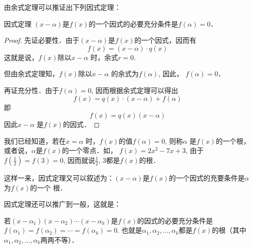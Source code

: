 由余式定理可以推证出下列因式定理：

\begin{blk}{因式定理}
$(x-\alpha)$是$f(x)$的一个因式的必要充分条件是$f (\alpha) =0$．
\end{blk}

\begin{proof}
  先证必要性．由于$(x-\alpha)$是$f(x)$的一个因式，因而有
\[f (x) = (x-\alpha ) \cdot q (x) \]
这就是说，$f(x)$除以$x-\alpha$ 时，余式$r=0$.

但由余式定理知，$f(x)$除以$x-\alpha$ 的余式为$f(\alpha )$, 因此，
$f (\alpha) =0$．

再证充分性．由于$f(\alpha )=0$, 因而根据余式定理可以得出
\[f (x) =q (x) \cdot  (x-\alpha ) +f (\alpha ) \]
即
\[f (x) =q (x) (x-\alpha )\]
因此$x-\alpha$ 是$f(x)$的因式．  
\end{proof}


我们已经知道，若在$x=\alpha$ 时，$f(x)$的值$f(\alpha )=0$, 则称$\alpha$ 是$f(x)$的一个根，或者说，$\alpha$是$f(x)$的一个零点．如，
$f(x)=2x^2-7x+3$, 由于$f\left(\frac{1}{2}\right)=f(3)=0$, 因而就说$\frac{1}{2}$,
3都是$f(x)$的根．

这样一来，因式定理又可以叙述为：$(x-\alpha)$是$f(x)$的一个因式的充要条件是$\alpha$ 为$f(x)$的一个
根．

因式定理还可以推广到一般，这就是：

若$(x-\alpha_1)(x-\alpha_2)\cdots(x-\alpha_k)$是$f(x)$的因式的必要充分条件是$f(\alpha_1)=f(\alpha_2) =\cdots=f(\alpha_k)=0$. 也就是$\alpha_1,\alpha_2,\ldots,\alpha_k$都是$f(x)$的根（其中$\alpha_1,\alpha_2,\ldots,\alpha_k$两两不等）．

